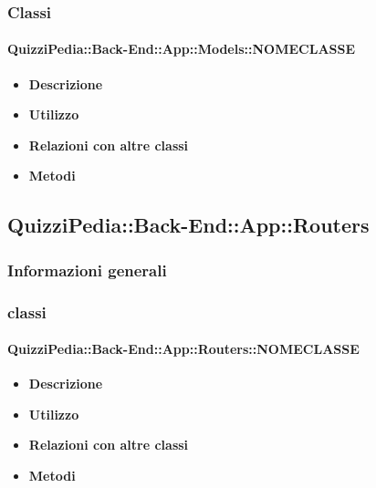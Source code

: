 \subsubsection{Classi}
\paragraph{QuizziPedia::Back-End::App::Models::NOMECLASSE}
\begin{itemize}
	\item \textbf{Descrizione} \\
	\item \textbf{Utilizzo} \\
	\item \textbf{Relazioni con altre classi} \\
	\item \textbf{Metodi} \\
\end{itemize}

\subsection{QuizziPedia::Back-End::App::Routers}
\subsubsection{Informazioni generali}
\subsubsection{classi}
\paragraph{QuizziPedia::Back-End::App::Routers::NOMECLASSE}
	\begin{itemize}
		\item \textbf{Descrizione} \\
		\item \textbf{Utilizzo} \\
		\item \textbf{Relazioni con altre classi} \\
		\item \textbf{Metodi} \\
	\end{itemize}
